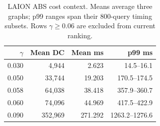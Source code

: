 \begin{table}[t]
\centering
\caption{LAION ABS cost context. Means average three graphs; p99 ranges span their 800-query timing subsets. Rows $\gamma\geq0.06$ are excluded from current ranking.}
\label{tab:abscost}
\small
\begin{tabular}{@{}rrrr@{}}
\toprule
$\gamma$ & Mean DC & Mean ms & p99 ms \\
\midrule
0.030 & 4,944 & 2.623 & 14.5--16.1 \\
0.050 & 33,744 & 19.203 & 170.5--174.5 \\
0.058 & 64,038 & 38.418 & 357.9--360.7 \\
0.060 & 74,096 & 44.969 & 417.5--422.9 \\
0.090 & 352,969 & 271.292 & 1263.2--1276.6 \\
\bottomrule
\end{tabular}
\end{table}
